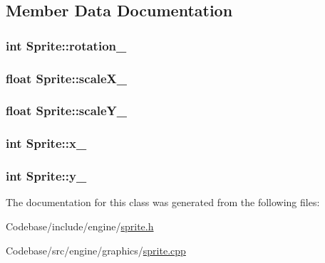 \subsection{Member Data Documentation}
\hypertarget{class_sprite_af429cf5ba45033ece6afa3371ae1ca32}{
\subsubsection[{rotation\-\_\-}]{\setlength{\rightskip}{0pt plus 5cm}int {\bf Sprite\-::rotation\-\_\-}}}\label{class_sprite_af429cf5ba45033ece6afa3371ae1ca32}
\hypertarget{class_sprite_aab809e2cb3503cd71f3acf00cb8bf03a}{
\subsubsection[{scale\-X\-\_\-}]{\setlength{\rightskip}{0pt plus 5cm}float {\bf Sprite\-::scale\-X\-\_\-}}}\label{class_sprite_aab809e2cb3503cd71f3acf00cb8bf03a}
\hypertarget{class_sprite_a26863cb8bcd854eb4f4c8777a79ce379}{
\subsubsection[{scale\-Y\-\_\-}]{\setlength{\rightskip}{0pt plus 5cm}float {\bf Sprite\-::scale\-Y\-\_\-}}}\label{class_sprite_a26863cb8bcd854eb4f4c8777a79ce379}
\hypertarget{class_sprite_ae4b1f0a19b406ffccc78e18f5e40e6f6}{
\subsubsection[{x\-\_\-}]{\setlength{\rightskip}{0pt plus 5cm}int {\bf Sprite\-::x\-\_\-}}}\label{class_sprite_ae4b1f0a19b406ffccc78e18f5e40e6f6}
\hypertarget{class_sprite_afd9f444fcd6f2d3d6bb0d7686e09d16e}{
\subsubsection[{y\-\_\-}]{\setlength{\rightskip}{0pt plus 5cm}int {\bf Sprite\-::y\-\_\-}}}\label{class_sprite_afd9f444fcd6f2d3d6bb0d7686e09d16e}


The documentation for this class was generated from the following files\-:\begin{DoxyCompactItemize}
\item 
Codebase/include/engine/\hyperlink{_codebase_2include_2engine_2sprite_8h}{sprite.\-h}\item 
Codebase/src/engine/graphics/\hyperlink{sprite_8cpp}{sprite.\-cpp}\end{DoxyCompactItemize}
